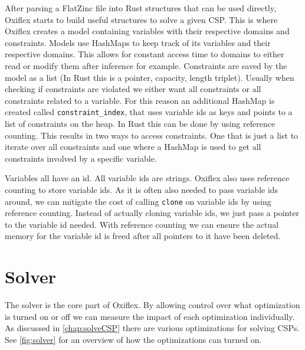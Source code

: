 After parsing a FlatZinc file into Rust structures that can be used directly, Oxiflex starts to build useful structures to solve a given CSP. This is where Oxiflex creates a model containing variables with their respective domains and constraints. Models use HashMaps to keep track of its variables and their respective domains. This allows for constant access time to domains to either read or modify them after inference for example. Constraints are saved by the model as a list (In Rust this is a pointer, capacity, length triplet). Usually when checking if constraints are violated we either want all constraints or all constraints related to a variable. For this reason an additional HashMap is created called \verb|constraint_index|, that uses variable ids as keys and points to a list of constraints on the heap. In Rust this can be done by using reference counting. This results in two ways to access constraints. One that is just a list to iterate over all constraints and one where a HashMap is used to get all constraints involved by a specific variable.

Variables all have an id. All variable ids are strings. Oxiflex also uses reference counting to store variable ids. As it is often also needed to pass variable ids around, we can mitigate the cost of calling \verb|clone| on variable ids by using reference counting. Instead of actually cloning variable ids, we just pass a pointer to the variable id needed. With reference counting we can ensure the actual memory for the variable id is freed after all pointers to it have been deleted.

\section{Solver}

The solver is the core part of Oxiflex. By allowing control over what optimization is turned on or off we can measure the impact of each optimization individually. As discussed in \cref{chap:solveCSP} there are various optimizations for solving CSPs. See \cref{fig:solver} for an overview of how the optimizations can turned on. \\

